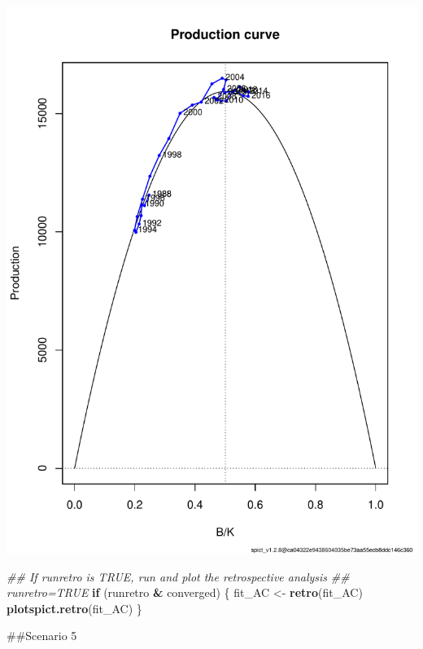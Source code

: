 \documentclass[
]{article}
\newenvironment{Shaded}{\begin{snugshade}}{\end{snugshade}}
\newcommand{\CommentTok}[1]{\textcolor[rgb]{0.56,0.35,0.01}{\textit{#1}}}
\newcommand{\ControlFlowTok}[1]{\textcolor[rgb]{0.13,0.29,0.53}{\textbf{#1}}}
\newcommand{\KeywordTok}[1]{\textcolor[rgb]{0.13,0.29,0.53}{\textbf{#1}}}
\newcommand{\NormalTok}[1]{#1}
\newcommand{\OperatorTok}[1]{\textcolor[rgb]{0.81,0.36,0.00}{\textbf{#1}}}
\newcommand{\StringTok}[1]{\textcolor[rgb]{0.31,0.60,0.02}{#1}}
\begin{document}
\includegraphics{aru.27.123a4_SPiCT_WD_files/figure-latex/diagnostics_scenario_4-2.pdf}

\begin{Shaded}
\begin{Highlighting}[]
  \CommentTok{## If runretro is TRUE, run and plot the retrospective analysis}
  \CommentTok{## runretro=TRUE}
\ControlFlowTok{if}\NormalTok{ (runretro }\OperatorTok{&}\StringTok{ }\NormalTok{converged) \{}
\NormalTok{    fit_AC <-}\StringTok{ }\KeywordTok{retro}\NormalTok{(fit_AC)}
    \KeywordTok{plotspict.retro}\NormalTok{(fit_AC)}
\NormalTok{  \}}
\end{Highlighting}
\end{Shaded}

\#\#Scenario 5
\end{document}

